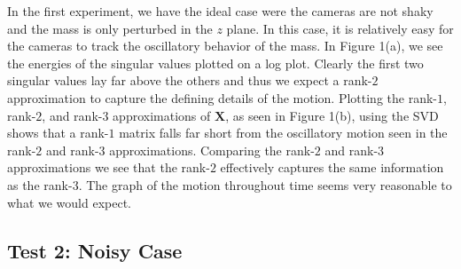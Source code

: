 \documentclass[12pt]{article}%
\begin{document}
In the first experiment, we have the ideal case were the cameras are not shaky and the mass is only perturbed in the $z$ plane. In this case, it is relatively easy for the cameras to track the oscillatory behavior of the mass. In Figure 1(a), we see the energies of the singular values plotted on a log plot. Clearly the first two singular values lay far above the others and thus we expect a rank-$2$ approximation to capture the defining details of the motion. Plotting the rank-$1$, rank-$2$, and rank-$3$ approximations of $\mathbf{X}$, as seen in Figure 1(b), using the SVD shows that a rank-$1$ matrix falls far short from the oscillatory motion seen in the rank-$2$ and rank-$3$ approximations. Comparing the rank-$2$ and rank-$3$ approximations we see that the rank-$2$ effectively captures the same information as the rank-$3$. The graph of the motion throughout time seems very reasonable to what we would expect. 





\subsection{Test 2: Noisy Case}
\end{document}
